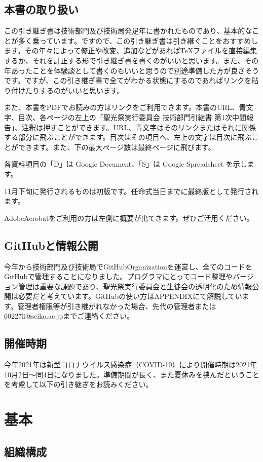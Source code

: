 \documentclass[dvipdfmx,jb5]{jarticle}
\begin{document}
\subsection{本書の取り扱い}
この引き継ぎ書は技術部門及び技術局発足年に書かれたものであり、基本的なことが多く乗っています。ですので、この引き継ぎ書は引き継ぐことをおすすめします。その年々によって修正や改変、追加などがあれば\TeX ファイルを直接編集するか、それを訂正する形で引き継ぎ書を書くのがいいと思います。また、その年あったことを体験談として書くのもいいと思うので別途準備した方が良さそうです。ですが、この引き継ぎ書で全てがわかる状態にするのであればリンクを貼り付けたりするのがいいと思います。

また、本書をPDFでお読みの方はリンクをご利用できます。本書のURL、青文字、目次、各ページの左上の「聖光祭実行委員会 技術部門引継書 第1次中間報告」、注釈は押すことができます。URL、青文字はそのリンクまたはそれに関係する部分に飛ぶことができます。目次はその項目へ、左上の文字は目次に飛ぶことができます。また、下の最大ページ数は最終ページに飛びます。

各資料項目の「D」は Google Document、「S」は Google Spreadsheet を示します。

11月下旬に発行されるものは初版です。任命式当日までに最終版として発行されます。

AdobeAcrobatをご利用の方は左側に概要が出てきます。ぜひご活用ください。
\subsection{GitHubと情報公開}
今年から技術部門及び技術局でGitHubOrganizationを運営し、全てのコードをGitHubで管理することになりました。プログラマにとってコード整理やバージョン管理は重要な課題であり、聖光祭実行委員会と生徒会の透明化のため情報公開は必要だと考えています。GitHubの使い方はAPPENDIXにて解説しています。管理者権限等が引き継がれなかった場合、先代の管理者または {\ttfamily 60227li@seiko.ac.jp}までご連絡ください。
\subsection{開催時期}
今年2021年は新型コロナウイルス感染症（COVID-19）により開催時期は2021年10月2日〜同4日になりました。準備期間が長く、また夏休みを挟んだということを考慮して以下の引き継ぎをお読みください。

\section{基本}
\subsection{組織構成}
\end{document}
